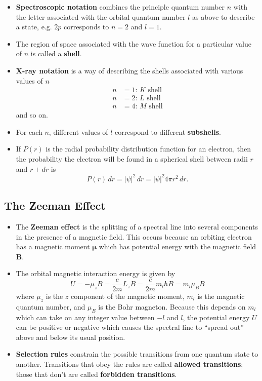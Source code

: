 \documentclass{article}
\begin{document}
\begin{itemize}
  \item \textbf{Spectroscopic notation} combines the principle quantum number $n$ with the letter associated with the orbital quantum number $l$ as above to describe a state, e.g. $2 p$ corresponds to $n = 2$ and $l = 1$.

  \item The region of space associated with the wave function for a particular value of $n$ is called a \textbf{shell}.

  \item \textbf{X-ray notation} is a way of describing the shells associated with various values of $n$ \begin{align*}
          n & = 1 \text{: } K \text{ shell} \\
          n & = 2 \text{: } L \text{ shell} \\
          n & = 4 \text{: } M \text{ shell}
        \end{align*} and so on.

  \item For each $n$, different values of $l$ correspond to different \textbf{subshells}.

  \item If $P(r)$ is the radial probability distribution function for an electron, then the probability the electron will be found in a spherical shell between radii $r$ and $r + d r$ is \[P(r) \,dr = |\psi|^2 \,dr = |\psi|^2 4 \pi r^2 \,dr.\]
\end{itemize}

\subsection{The Zeeman Effect}

\begin{itemize}
  \item The \textbf{Zeeman effect} is the splitting of a spectral line into several components in the presence of a magnetic field. This occurs because an orbiting electron has a magnetic moment $\boldsymbol{\mu}$ which has potential energy with the magnetic field $\mathbf{B}$.

\item The orbital magnetic interaction energy is given by \[U = -\mu_z B = \frac{e}{2 m} L_z B = \frac{e}{2 m} m_l \hbar B = m_l \mu_B B\] where $\mu_z$ is the $z$ component of the magnetic moment, $m_l$ is the magnetic quantum number, and $\mu_B$ is the Bohr magneton. Because this depends on $m_l$ which can take on any integer value between $-l$ and $l$, the potential energy $U$ can be positive or negative which causes the spectral line to ``spread out'' above and below its usual position.

  \item \textbf{Selection rules} constrain the possible transitions from one quantum state to another. Transitions that obey the rules are called \textbf{allowed transitions}; those that don't are called \textbf{forbidden transitions}.
\end{itemize}
\end{document}
